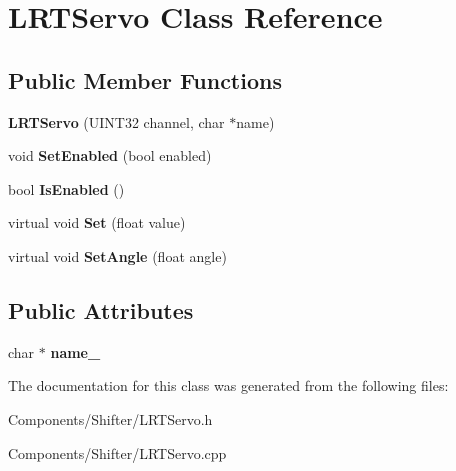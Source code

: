 \hypertarget{class_l_r_t_servo}{
\section{\-L\-R\-T\-Servo \-Class \-Reference}
\label{class_l_r_t_servo}
}
\subsection*{\-Public \-Member \-Functions}
\begin{DoxyCompactItemize}
\item 
\hypertarget{class_l_r_t_servo_a7da95fd35932baab54afd3b55ddcafaf}{
{\bfseries \-L\-R\-T\-Servo} (\-U\-I\-N\-T32 channel, char $\ast$name)}
\label{class_l_r_t_servo_a7da95fd35932baab54afd3b55ddcafaf}

\item 
\hypertarget{class_l_r_t_servo_a6e2021e9b1d76bcc10471a8eeb56a4ec}{
void {\bfseries \-Set\-Enabled} (bool enabled)}
\label{class_l_r_t_servo_a6e2021e9b1d76bcc10471a8eeb56a4ec}

\item 
\hypertarget{class_l_r_t_servo_a355598c854d838db85ea442fb6a2fec2}{
bool {\bfseries \-Is\-Enabled} ()}
\label{class_l_r_t_servo_a355598c854d838db85ea442fb6a2fec2}

\item 
\hypertarget{class_l_r_t_servo_a2241ae3556c0c5fba513d6ef7b405d1b}{
virtual void {\bfseries \-Set} (float value)}
\label{class_l_r_t_servo_a2241ae3556c0c5fba513d6ef7b405d1b}

\item 
\hypertarget{class_l_r_t_servo_a635ef34ec30e29d59545bebbe8146e16}{
virtual void {\bfseries \-Set\-Angle} (float angle)}
\label{class_l_r_t_servo_a635ef34ec30e29d59545bebbe8146e16}

\end{DoxyCompactItemize}
\subsection*{\-Public \-Attributes}
\begin{DoxyCompactItemize}
\item 
\hypertarget{class_l_r_t_servo_ac84528961cf7cf2d9d9fb2cab9d19f1c}{
char $\ast$ {\bfseries name\-\_\-}}
\label{class_l_r_t_servo_ac84528961cf7cf2d9d9fb2cab9d19f1c}

\end{DoxyCompactItemize}


\-The documentation for this class was generated from the following files\-:\begin{DoxyCompactItemize}
\item 
\-Components/\-Shifter/\-L\-R\-T\-Servo.\-h\item 
\-Components/\-Shifter/\-L\-R\-T\-Servo.\-cpp\end{DoxyCompactItemize}
